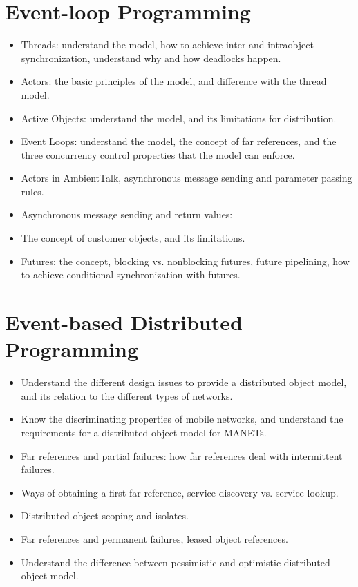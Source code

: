 \documentclass[a4paper]{report}
\begin{document}
\chapter{Event-loop Programming}
\begin{itemize}
  \item Threads: understand the model, how to achieve inter and intraobject synchronization,
  understand why and how deadlocks happen.
  \item Actors: the basic principles of the model, and difference with the thread model.
  \item Active Objects: understand the model, and its limitations for distribution.
  \item Event Loops: understand the model, the concept of far references, and the three
  concurrency control properties that the model can enforce.
  \item Actors in AmbientTalk, asynchronous message sending and parameter passing rules.
  \item Asynchronous message sending and return values:
  \item The concept of customer objects, and its limitations.
  \item Futures: the concept, blocking vs. nonblocking futures, future pipelining, how to
  achieve conditional synchronization with futures.
\end{itemize}

\chapter{Event-based Distributed Programming}
\begin{itemize}
  \item Understand the different design issues to provide a distributed object model, and its
  relation to the different types of networks.
  \item Know the discriminating properties of mobile networks, and understand the
  requirements for a distributed object model for MANETs.
  \item Far references and partial failures: how far references deal with intermittent failures.
  \item Ways of obtaining a first far reference, service discovery vs. service lookup.
  \item Distributed object scoping and isolates.
  \item Far references and permanent failures, leased object references.
  \item Understand the difference between pessimistic and optimistic distributed object model.
\end{itemize}
\end{document}
